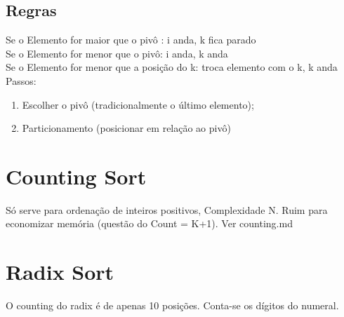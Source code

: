 \documentclass[•]{article}
\begin{document}
		\subsection{Regras}
		Se o Elemento for maior que o pivô	: i anda, k fica parado\\
		Se o Elemento for menor que o pivô: i anda, k anda\\
		Se o Elemento for menor que a posição do k: troca elemento com o k, k anda
		Passos:
		\begin{enumerate}
			\item Escolher o pivô (tradicionalmente o último elemento);
			\item Particionamento (posicionar em relação ao pivô)\\
			
			
			
		\end{enumerate}
	\section{Counting Sort}
		Só serve para ordenação de inteiros positivos, Complexidade N. Ruim para economizar memória (questão do Count = K+1). Ver counting.md
	\section{Radix Sort}
		O counting do radix é de apenas 10 posições. Conta-se os dígitos do numeral.
		
\end{document}
